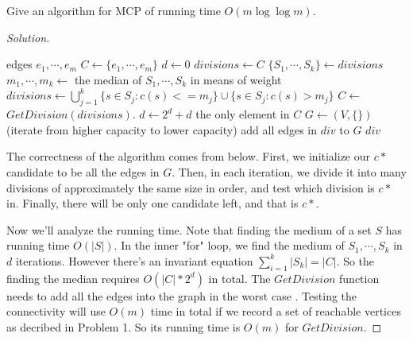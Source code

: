 



    \begin{thm}{}{}
        Give an algorithm for MCP of running time $O(m\log\log m)$.
    \end{thm}
    \begin{proof}[Solution]
        \begin{algorithm}
            \label{alg:algorithm}
            \begin{algorithmic}
                \Require edges $e_1,\cdots,e_m$
                    \State $C\gets \{e_1,\cdots,e_m\}$
                    \State $d\gets 0$
                        \State $divisions\gets C$
                            \State $\{S_1,\cdots,S_k\}\gets divisions$
                            \State $m_{1},\cdots,m_{k}\gets$ the median of $S_1,\cdots,S_k$ in means of weight
                            \State $divisions\gets \bigcup\limits_{j=1}^{k} \{s\in S_{j}:c(s)<=m_{j}\}\cup \{s\in S_{j}:c(s)>m_{j}\}$
                        \EndFor
                        \State $C\gets$ $GetDivision(divisions)$.
                    \State $d\gets 2^{d}+d$
                    \EndWhile
                    \State \Return the only element in $C$
                \EndFunction
                    \State $G\gets (V,\{\})$
                     (iterate from higher capacity to lower capacity)
                        \State add all edges in $div$ to $G$
                            \State \Return $div$
                        \EndIf
                    \EndFor
                \EndFunction
            \end{algorithmic}
        \end{algorithm}
        The correctness of the algorithm comes from below.
        First, we initialize our $c*$ candidate to be all the edges in $G$.
        Then, in each iteration, we divide it into many divisions of approximately the same size in order, and test which division is $c*$ in.
        Finally, there will be only one candidate left, and that is $c*$.

        Now we'll analyze the running time.
        Note that finding the medium of a set $S$ has running time $O(|S|)$.
        In the inner "for" loop, we find the medium of $S_1,\cdots,S_k$ in $d$ iterations.
        However there's an invariant equation $\sum_{i=1}^{k}|S_k|=|C|$.
        So the finding the median requires $O(|C|*2^{d})$ in total.
        The $GetDivision$ function needs to add all the edges into the graph in the worst case .
        Testing the connectivity will use $O(m)$ time in total if we record a set of reachable vertices as decribed in Problem 1.
        So its running time is $O(m)$ for $GetDivision$.


\end{proof}
